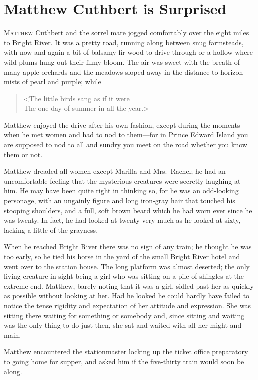 \chapter{Matthew Cuthbert is Surprised}

\lettrine[]{M}{atthew} Cuthbert and the sorrel mare jogged comfortably over the eight miles to Bright River. It was a pretty road, running along between snug farmsteads, with now and again a bit of balsamy fir wood to drive through or a hollow where wild plums hung out their filmy bloom. The air was sweet with the breath of many apple orchards and the meadows sloped away in the distance to horizon mists of pearl and purple; while

\begin{verse}
<The little birds sang as if it were\\
The one day of summer in all the year.>
\end{verse}

Matthew enjoyed the drive after his own fashion, except during the moments when he met women and had to nod to them—for in Prince Edward Island you are supposed to nod to all and sundry you meet on the road whether you know them or not.

Matthew dreaded all women except Marilla and Mrs.~Rachel; he had an uncomfortable feeling that the mysterious creatures were secretly laughing at him. He may have been quite right in thinking so, for he was an odd-looking personage, with an ungainly figure and long iron-gray hair that touched his stooping shoulders, and a full, soft brown beard which he had worn ever since he was twenty. In fact, he had looked at twenty very much as he looked at sixty, lacking a little of the grayness.

When he reached Bright River there was no sign of any train; he thought he was too early, so he tied his horse in the yard of the small Bright River hotel and went over to the station house. The long platform was almost deserted; the only living creature in sight being a girl who was sitting on a pile of shingles at the extreme end. Matthew, barely noting that it was a girl, sidled past her as quickly as possible without looking at her. Had he looked he could hardly have failed to notice the tense rigidity and expectation of her attitude and expression. She was sitting there waiting for something or somebody and, since sitting and waiting was the only thing to do just then, she sat and waited with all her might and main.

Matthew encountered the stationmaster locking up the ticket office preparatory to going home for supper, and asked him if the five-thirty train would soon be along.

